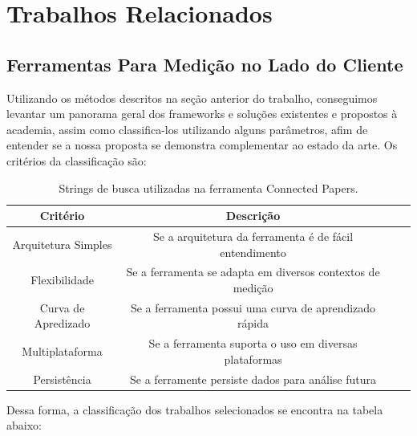 \documentclass[12pt]{tcc}
\begin{document}
\chapter{Trabalhos Relacionados}
\label{sec:trabalhos_relacionados}
	\label{sec:trab_relacionados}

	\section{Ferramentas Para Medição no Lado do Cliente}
	Utilizando os métodos descritos na seção anterior do trabalho, conseguimos levantar um panorama geral dos frameworks e soluções existentes e propostos à academia, assim como classifica-los utilizando alguns parâmetros, afim de entender se a nossa proposta se demonstra complementar ao estado da arte. 
	Os critérios da classificação são: 


	\begin{table}[!ht]
		\centering
		\caption{Strings de busca utilizadas na ferramenta Connected Papers.}
		\begin{tabular}{c c L{1.5cm} R{1.5cm}}
			\toprule
			\textbf{Critério} & \textbf{Descrição}\\
			\midrule
			Arquitetura Simples & Se a arquitetura da ferramenta é de fácil entendimento\\
			Flexibilidade&Se a ferramenta se adapta em diversos contextos de medição\\
			Curva de Apredizado&Se a ferramenta possui uma curva de aprendizado rápida\\
			Multiplataforma&Se a ferramenta suporta o uso em diversas plataformas\\
			Persistência&Se a ferramente persiste dados para análise futura\\
			\bottomrule
		\end{tabular}
		\label{tab:string-busca-connected-papers}
	\end{table}


	\par Dessa forma, a classificação dos trabalhos selecionados se encontra na tabela abaixo:
\end{document}
